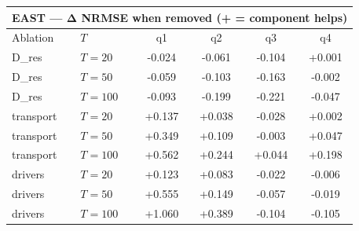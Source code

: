 \begin{tabular}{llcccc}
\toprule
\multicolumn{6}{c}{EAST — Δ NRMSE when removed (+ = component helps)} \\
\midrule
Ablation & $T$ & q1 & q2 & q3 & q4 \\
\midrule
D_res & $T{=}20$ & -0.024 & -0.061 & -0.104 & +0.001 \\
D_res & $T{=}50$ & -0.059 & -0.103 & -0.163 & -0.002 \\
D_res & $T{=}100$ & -0.093 & -0.199 & -0.221 & -0.047 \\
transport & $T{=}20$ & +0.137 & +0.038 & -0.028 & +0.002 \\
transport & $T{=}50$ & +0.349 & +0.109 & -0.003 & +0.047 \\
transport & $T{=}100$ & +0.562 & +0.244 & +0.044 & +0.198 \\
drivers & $T{=}20$ & +0.123 & +0.083 & -0.022 & -0.006 \\
drivers & $T{=}50$ & +0.555 & +0.149 & -0.057 & -0.019 \\
drivers & $T{=}100$ & +1.060 & +0.389 & -0.104 & -0.105 \\
\bottomrule
\end{tabular}